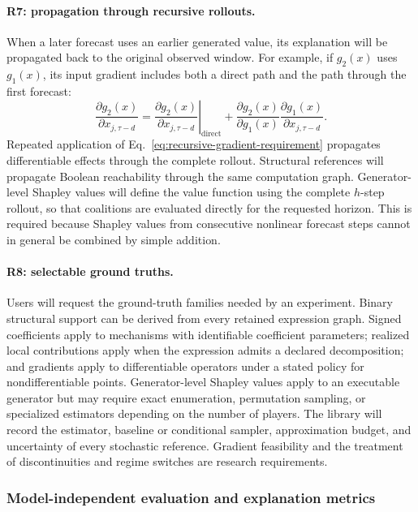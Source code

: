 \paragraph{R7: propagation through recursive rollouts.}
When a later forecast uses an earlier generated value, its explanation will be
propagated back to the original observed window. For example, if $g_2(x)$ uses
$g_1(x)$, its input gradient includes both a direct path and the path through
the first forecast:
\begin{equation}
\frac{\partial g_2(x)}{\partial x_{j,\tau-d}}
=
\left.
\frac{\partial g_2(x)}{\partial x_{j,\tau-d}}
\right|_{\mathrm{direct}}
+
\frac{\partial g_2(x)}{\partial g_1(x)}
\frac{\partial g_1(x)}{\partial x_{j,\tau-d}}.
\label{eq:recursive-gradient-requirement}
\end{equation}
Repeated application of Eq.~\eqref{eq:recursive-gradient-requirement}
propagates differentiable effects through the complete rollout. Structural
references will propagate Boolean reachability through the same computation
graph. Generator-level Shapley values will define the value function using the
complete $h$-step rollout, so that coalitions are evaluated directly for the
requested horizon. This is required because Shapley values from consecutive
nonlinear forecast steps cannot in general be combined by simple addition.

\paragraph{R8: selectable ground truths.}
Users will request the ground-truth families needed by an experiment. Binary
structural support can be derived from every retained expression graph. Signed
coefficients apply to mechanisms with identifiable coefficient parameters;
realized local contributions apply when the expression admits a declared
decomposition; and gradients apply to differentiable operators under a stated
policy for nondifferentiable points. Generator-level Shapley values apply to an
executable generator but may require exact enumeration, permutation sampling,
or specialized estimators depending on the number of players. The library will
record the estimator, baseline or conditional sampler, approximation budget,
and uncertainty of every stochastic reference. Gradient feasibility and the
treatment of discontinuities and regime switches are research requirements.

\subsubsection{Model-independent evaluation and explanation metrics}


